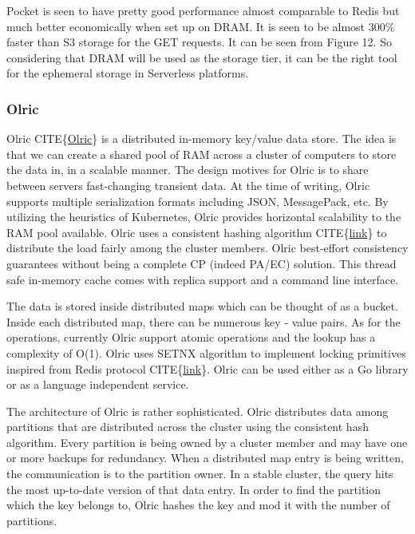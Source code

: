 \documentclass[12pt,titlepage]{article}
\begin{document}
Pocket is seen to have pretty good performance almost comparable to Redis but
much better economically when set up on DRAM. It is seen to be almost 300\%
faster than S3 storage for the GET requests. It can be seen from Figure 12.
So considering that DRAM will be used as the storage tier, it can be the
right tool for the ephemeral storage in Serverless platforms. 

\subsubsection{Olric}
\label{sec:org726b221}
Olric CITE\{\href{https://github.com/buraksezer/olric}{Olric}\} is a distributed in-memory key/value data store. The idea is
that we can create a shared pool of RAM across a cluster of computers to store
the data in, in a scalable manner. The design motives for Olric is to share
between servers fast-changing transient data. At the time of writing, Olric
supports multiple serialization formats including JSON, MessagePack, etc. By
utilizing the heuristics of Kubernetes, Olric provides horizontal scalability to
the RAM pool available. Olric uses a consistent hashing algorithm CITE\{\href{https://github.com/buraksezer/consistent}{link}\} to distribute
the load fairly among the cluster members. Olric best-effort consistency
guarantees without being a complete CP (indeed PA/EC) solution. This thread safe
in-memory cache comes with replica support and a command line interface.

The data is stored inside distributed maps which can be thought of as a bucket.
Inside each distributed map, there can be numerous key - value pairs. As for the
operations, currently Olric support atomic operations and the lookup
has a complexity of O(1). Olric uses SETNX algorithm to implement locking
primitives inspired from Redis protocol CITE\{\href{https://redis.io/commands/setnx\#design-pattern-locking-with-codesetnxcode}{link}\}. Olric can be used either as a
Go library or as a language independent service.

The architecture of Olric is rather sophisticated. Olric distributes data among
partitions that are distributed across the cluster using the consistent hash algorithm. Every partition is being
owned by a cluster member and may have one or more backups for redundancy. When
a distributed map entry is being written, the communication is to the partition
owner. In a stable cluster, the query hits the most up-to-date version of that
data entry. In order to find the partition which the key belongs to, Olric
hashes the key and mod it with the number of partitions.
\end{document}
